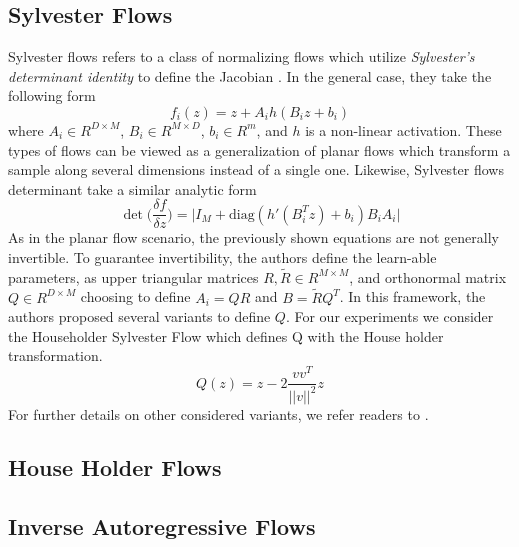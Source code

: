 \subsection{Sylvester Flows}

Sylvester flows refers to a class of normalizing flows which utilize \textit{Sylvester's determinant identity} to define the Jacobian \cite{vdberg2018sylvester}. In the general case, they take the following form
\begin{equation}
	f_{i}(z) = z + A_{i} h(B_{i}z + b_{i})
\end{equation}
where $A_{i} \in R^{D \times M}$, $B_{i} \in R^{M \times D}$, $b_{i} \in R^{m}$, and $h$ is a non-linear activation. These types of flows can be viewed as a generalization of planar flows which transform a sample along several dimensions instead of a single one. Likewise, Sylvester flows determinant take a similar analytic form
\begin{equation} 
	\det \bigg( \frac{\delta f}{\delta z} \bigg) = \bigg| I_{M} + \text{diag} ( h'(B_{i}^{T} z ) + b_{i})B_{i}A_{i} \bigg|
\end{equation}
As in the planar flow scenario, the previously shown equations are not generally invertible. To guarantee invertibility, the authors define the learn-able parameters, as upper triangular matrices $R, \tilde{R} \in R^{M \times M}$, and orthonormal matrix $Q \in R^{D \times M}$ choosing to define $A_{i} = QR$ and $B=\tilde{R}Q^{T}$. In this framework, the authors proposed several variants to define $Q$. For our experiments we consider the Householder Sylvester Flow which defines Q with the House holder transformation.
\begin{equation}
	Q(z) = z - 2 \frac{vv^{T}}{||v||^{2}} z
\end{equation}
For further details on other considered variants, we refer readers to \citet{vdberg2018sylvester}. 

\subsection{House Holder Flows}



\subsection{Inverse Autoregressive Flows}




